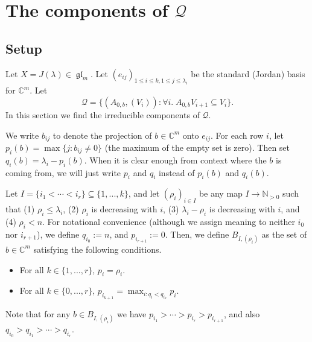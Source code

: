 \documentclass[12pt,psamsfonts]{article}
\DeclareMathOperator{\gl}{\mathfrak{gl}}
\begin{document}
\section{The components of \texorpdfstring{\(\mathcal{Q}\)}{Q}}
\subsection{Setup}
Let \(X = J(\lambda) \in \gl_m\).
Let \((e_{ij})_{1 \leq i \leq k, 1 \leq j \leq \lambda_i}\) be the standard (Jordan) basis for \(\mathbb{C}^m\).
Let
\[\mathcal{Q} = \{(A_{0,b}, (V_i)) : \forall i. \; A_{0,b} V_{i + 1} \subseteq V_i\}.\]
In this section we find the irreducible components of \(\mathcal{Q}\).
\par We write \(b_{ij}\) to denote the projection of \(b \in \mathbb{C}^m\) onto \(e_{ij}\).
For each row \(i\), let \(p_i(b) = \max\{j : b_{ij} \neq 0\}\) (the maximum of the empty set is zero).
Then set \(q_i(b) = \lambda_i - p_i(b)\).
When it is clear enough from context where the \(b\) is coming from, we will just write \(p_i\) and \(q_i\) instead of \(p_i(b)\) and \(q_i(b)\).
\par Let \(I = \{i_1 < \cdots < i_r\} \subseteq \{1, ..., k\}\), and let \((\rho_i)_{i \in I}\) be any map \(I \to \mathbb{N}_{> 0}\) such that (1) \(\rho_i \leq \lambda_i\), (2) \(\rho_i\) is decreasing with \(i\), (3) \(\lambda_i - \rho_i\) is decreasing with \(i\), and (4) \(\rho_i < n\).
For notational convenience (although we assign meaning to neither \(i_0\) nor \(i_{r + 1}\)), we define \(q_{i_0} := n\), and \(p_{i_{r + 1}} := 0\).
Then, we define \(B_{I, (\rho_i)}\) as the set of \(b \in \mathbb{C}^m\) satisfying the following conditions.
\begin{itemize}
    \item For all \(k \in \{1, ..., r\}\), \(p_i = \rho_i\).
    \item For all \(k \in \{0, ..., r\}\), \(p_{i_{k + 1}} = \max_{i : q_i < q_{i_k}} p_i\).
\end{itemize}
Note that for any \(b \in B_{I, (\rho_i)}\) we have \(p_{i_1} > \cdots > p_{i_r} > p_{i_{r + 1}}\), and also \(q_{i_0} > q_{i_1} > \cdots > q_{i_r}\).
\end{document}
